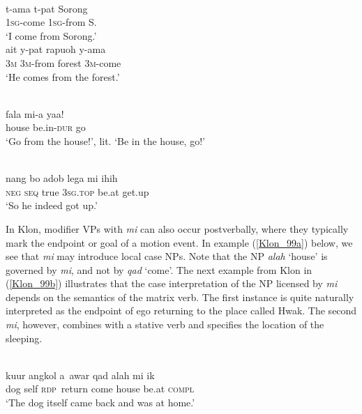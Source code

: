 \ea \label{Maybrat_60}
\\
\ea
\gll t-ama t-pat Sorong \\
1\textsc{sg}-come 1\textsc{sg}-from S. \\
\glft `I come from Sorong.' \\ 
\ex
\gll ait y-pat rapuoh y-ama \\ 
3\textsc{m} 3\textsc{m}-from forest 3\textsc{m}-come \\
\glft `He comes from the forest.'\\ 
\z
\z

\ea \label{Abui_24}
\\
\gll fala mi-a yaa! \\
house be.in-\textsc{dur} go \\
\glft `Go from the house!', lit. `Be in the house, go!’\\
\z

\ea \label{Klon_48}
\\
\gll nang bo adob lega mi ihih \\
\textsc{neg} \textsc{seq} true 3\textsc{sg}.\textsc{top} be.at get.up \\
\glft `So he indeed got up.'\\ 
\z

In Klon, modifier VPs with \textit{mi} can also occur postverbally, where they typically mark the endpoint or goal of a motion event. In example (\ref{Klon_99a}) below, we see that \textit{mi} may introduce local case NPs. Note that the NP \textit{alah} `house' is governed by \textit{mi}, and not by \textit{qad} `come'. The next example from Klon in (\ref{Klon_99b}) illustrates that the case interpretation of the NP licensed by \textit{mi} depends on the semantics of the matrix verb. The first instance is quite naturally interpreted as the endpoint of ego returning to the place called Hwak. The second \textit{mi}, however, combines with a stative verb and specifies the location of the sleeping.

\ea \label{Klon_99a}
\\
\gll kuur angkol a~awar qad alah mi ik \\
dog self \textsc{rdp}~return come house be.at \textsc{compl} \\
\glft `The dog itself came back and was at home.'\\ 
\z

